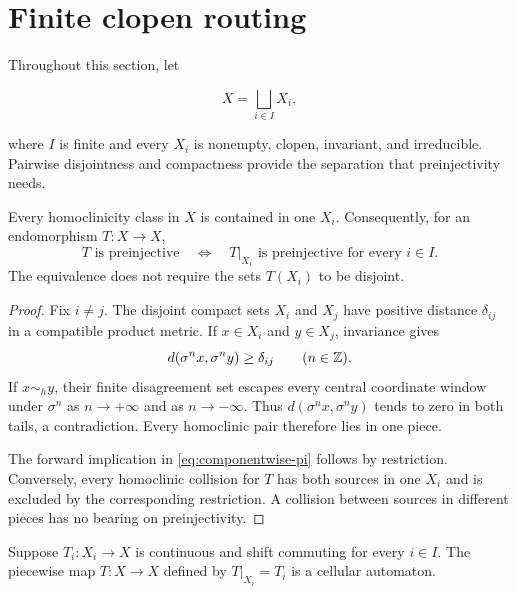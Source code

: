 \section{Finite clopen routing}
\label{sec:routing}

Throughout this section, let

\begin{equation}
  X=\bigsqcup_{i\in I}X_i,
  \label{eq:finite-clopen-partition}
\end{equation}

where $I$ is finite and every $X_i$ is nonempty, clopen, invariant, and
irreducible.  Pairwise disjointness and compactness provide the separation
that preinjectivity needs.

\begin{lemma}
\label{lem:homoclinic-separation}
Every homoclinicity class in $X$ is contained in one $X_i$.  Consequently, for
an endomorphism $T:X\to X$,
\begin{equation}
 T\text{ is preinjective}
 \quad\Longleftrightarrow\quad
 T|_{X_i}\text{ is preinjective for every }i\in I.
 \label{eq:componentwise-pi}
\end{equation}
The equivalence does not require the sets $T(X_i)$ to be disjoint.
\end{lemma}

\begin{proof}
Fix $i\ne j$.  The disjoint compact sets $X_i$ and $X_j$ have positive
distance $\delta_{ij}$ in a compatible product metric.  If $x\in X_i$ and
$y\in X_j$, invariance gives
\[
 d(\sigma^n x,\sigma^n y)\geq\delta_{ij}
 \qquad(n\in\mathbb{Z}).
\]
If $x\sim_h y$, their finite disagreement set escapes every central
coordinate window under $\sigma^n$ as $n\to+\infty$ and as $n\to-\infty$.
Thus $d(\sigma^n x,\sigma^n y)$ tends to zero in both tails, a contradiction.
Every homoclinic pair therefore lies in one piece.

The forward implication in \eqref{eq:componentwise-pi} follows by
restriction.  Conversely, every homoclinic collision for $T$ has both sources
in one $X_i$ and is excluded by the corresponding restriction.  A collision
between sources in different pieces has no bearing on preinjectivity.
\end{proof}

\begin{lemma}
\label{lem:clopen-pasting}
Suppose $T_i:X_i\to X$ is continuous and shift commuting for every $i\in I$.
The piecewise map $T:X\to X$ defined by $T|_{X_i}=T_i$ is a cellular
automaton.
\end{lemma}

